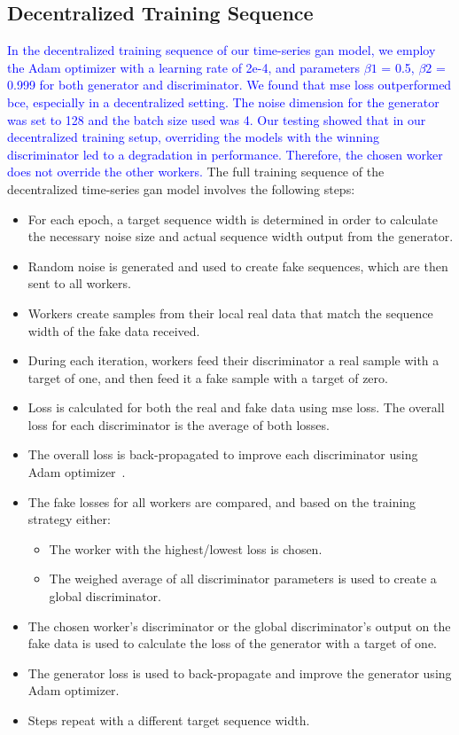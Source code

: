 \subsection{Decentralized Training Sequence}
%
\textcolor{blue}{ In the decentralized training sequence of our time-series \gls*{gan} model, we employ the Adam optimizer with a learning rate of 2e-4, and parameters $\beta1$ = 0.5, $\beta2$ = 0.999 for both generator and discriminator.  We found that \gls*{mse} loss outperformed \gls*{bce}, especially in a decentralized setting. The noise dimension for the generator was set to 128 and the batch size used was 4. Our testing showed that in our decentralized training setup, overriding the models with the winning discriminator led to a degradation in performance. Therefore, the chosen worker does not override the other workers.} The full training sequence of the decentralized time-series \gls*{gan} model involves the following steps:
%
\begin{itemize}
\item For each epoch, a target sequence width is determined in order to calculate the necessary noise size and actual sequence width output from the generator.
\item Random noise is generated and used to create fake sequences, which are then sent to all workers.
\item Workers create samples from their local real data that match the sequence width of the fake data received.
\item During each iteration, workers feed their discriminator a real sample with a target of one, and then feed it a fake sample with a target of zero.
\item Loss is calculated for both the real and fake data using \gls*{mse} loss. The overall loss for each discriminator is the average of both losses.
\item The overall loss is back-propagated to improve each discriminator using Adam optimizer~\cite{adam_optimizer}.
\item The fake losses for all workers are compared, and based on the training strategy either:
\begin{itemize}
\item The worker with the highest/lowest loss is chosen.
\item The weighed average of all discriminator parameters is used to create a global discriminator. %
\end{itemize}
\item The chosen worker's discriminator or the global discriminator's output on the fake data is used to calculate the loss of the generator with a target of one.
\item The generator loss is used to back-propagate and improve the generator using Adam optimizer.
\item Steps repeat with a different target sequence width.
\end{itemize}


